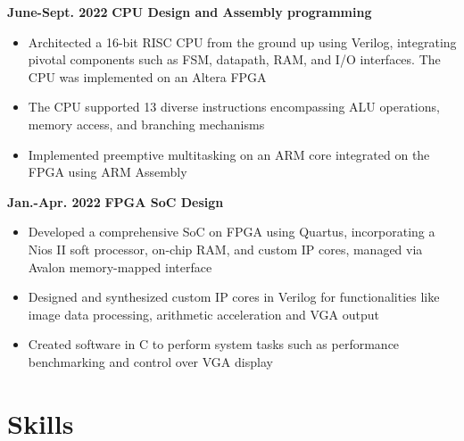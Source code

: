 \documentclass[11pt,a4paper,sans]{moderncv}
\begin{document}

\cventry
{\textnormal{\textbf{June-Sept. 2022}}}
{\textnormal{\textbf{CPU Design and Assembly programming}}}
{}{}{}
{
    \begin{itemize}
    \item Architected a 16-bit RISC CPU from the ground up using Verilog, integrating pivotal components such as FSM, datapath, RAM, and I/O interfaces. The CPU was implemented on an Altera FPGA
    \item The CPU supported 13 diverse instructions encompassing ALU operations, memory access, and branching mechanisms
    \item Implemented preemptive multitasking on an ARM core integrated on the FPGA using ARM Assembly
\end{itemize}
}

\cventry
{\textnormal{\textbf{Jan.-Apr. 2022}}}
{\textnormal{\textbf{FPGA SoC Design}}}
{}{}{}
{
    \begin{itemize}
    \item Developed a comprehensive SoC on FPGA using Quartus, incorporating a Nios II soft processor, on-chip RAM, and custom IP cores, managed via Avalon memory-mapped interface
    \item Designed and synthesized custom IP cores in Verilog for functionalities like image data processing, arithmetic acceleration and VGA output
    \item Created software in C to perform system tasks such as performance benchmarking and control over VGA display
    \end{itemize}
}

\section{Skills}
\end{document}
